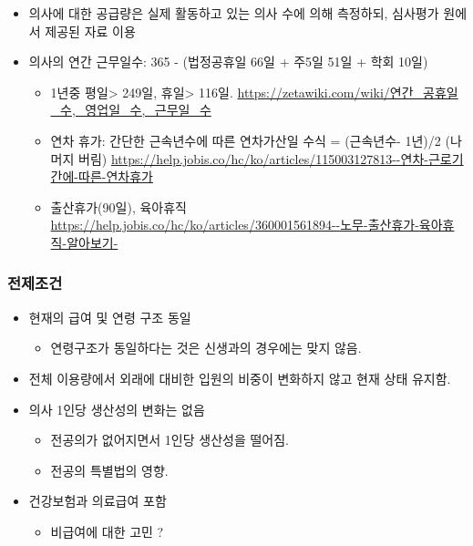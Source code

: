 \documentclass[]{book}
\providecommand{\tightlist}{%
  \setlength{\itemsep}{0pt}\setlength{\parskip}{0pt}}
\begin{document}
\begin{itemize}
\item
  의사에 대한 공급량은 실제 활동하고 있는 의사 수에 의해 측정하되, 심사평가 원에서 제공된 자료 이용
\item
  의사의 연간 근무일수: 365 - (법정공휴일 66일 + 주5일 51일 + 학회 10일)

  \begin{itemize}
  \tightlist
  \item
    1년중 평일\textgreater{} 249일, 휴일\textgreater{} 116일. \url{https://zetawiki.com/wiki/연간_공휴일_수,_영업일_수,_근무일_수}
  \item
    연차 휴가: 간단한 근속년수에 따른 연차가산일 수식 = (근속년수- 1년)/2 (나머지 버림) \url{https://help.jobis.co/hc/ko/articles/115003127813--연차-근로기간에-따른-연차휴가}
  \item
    출산휴가(90일), 육아휴직 \url{https://help.jobis.co/hc/ko/articles/360001561894--노무-출산휴가-육아휴직-알아보기-}
  \end{itemize}
\end{itemize}

\hypertarget{section-6}{%
\subsubsection{전제조건}\label{section-6}}

\begin{itemize}
\item
  현재의 급여 및 연령 구조 동일

  \begin{itemize}
  \tightlist
  \item
    연령구조가 동일하다는 것은 신생과의 경우에는 맞지 않음.
  \end{itemize}
\item
  전체 이용량에서 외래에 대비한 입원의 비중이 변화하지 않고 현재 상태 유지함.
\item
  의사 1인당 생산성의 변화는 없음

  \begin{itemize}
  \tightlist
  \item
    전공의가 없어지면서 1인당 생산성을 떨어짐.
  \item
    전공의 특별법의 영향.
  \end{itemize}
\item
  건강보험과 의료급여 포함

  \begin{itemize}
  \tightlist
  \item
    비급여에 대한 고민 ?
  \end{itemize}
\end{itemize}
\end{document}
